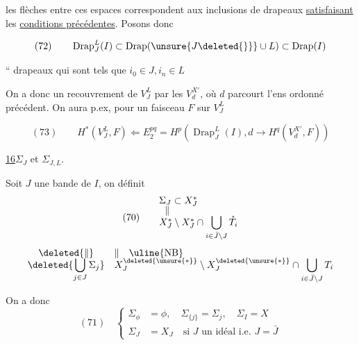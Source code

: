 les flèches entre ces espaces correspondent aux inclusions de drapeaux \uline{satisfaisant} les \uline{conditions précédentes}. Posons donc

\[
(72)\qquad\operatorname{Drap}_J^L(I)\subset\operatorname{Drap}(\unsure{J\deleted{\}}}\cup L)\subset\operatorname{Drap}(I)
\]

`` drapeaux  qui sont tels que $i_0\in J,i_n\in L$

On a donc un recouvrement de $V_J^L$ par les $V_d^{X'}$, où $d$ parcourt l'ens ordonné précédent. On aura p.ex, pour un faisceau $F$ sur $V_J^L$

\[
(73)\qquad H^*(V_J^L,F)\Longleftarrow E_2^{pq}=H^p(\operatorname{Drap}_J^L(I),d\to H^q(V_d^{X'},F))
\]



\noindent\uline{16}\quad $\Sigma_J$ et $\Sigma_{J,L}$.


Soit $J$ une bande de $I$, on définit
\[
(70)\qquad
\begin{array}{@{}l@{}}
\Sigma_J\subset X_J^*\\[-.4ex]
\hspace{.6em}\Vert\\[-.4ex]
X_J^*\setminus X_J^*\cap\displaystyle\bigcup_{i\in\bar J\setminus J}\mathring T_i
\end{array}
\]
\[
\begin{array}{@{}c@{\quad}l@{}}
\deleted{\Vert}&\Vert\quad\text{\uline{NB}}\\[-.4ex]
\deleted{\displaystyle\bigcup_{j\in J}\Sigma_j}&
X_J^{\deleted{\unsure{*}}}\setminus X_J^{\deleted{\unsure{*}}}\cap\displaystyle\bigcup_{i\in\bar J\setminus J}T_i
\end{array}
\]

On a donc
\[
(71)\quad\left\{
\begin{aligned}
\Sigma_{\phi}&=\phi,\quad\Sigma_{\{j\}}=\Sigma_j,\quad\Sigma_I=X\\
\Sigma_J&=X_J\quad\text{si $J$ un idéal i.e. $J=\bar J$}
\end{aligned}\right.
\]

